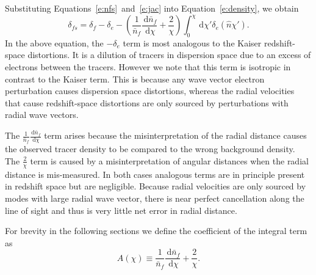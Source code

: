 \documentclass[twocolumn,prl,floatfix]{revtex4-1}
\makeatletter
\newcommand{\ud}{\,\mathrm{d}}
\def\ignorespacesandimplicitepars{%
  \begingroup
  \catcode13=10
  \@ifnextchar\relax
    {\endgroup}%
    {\endgroup}%
}
\renewcommand{\section}[1]{\emph{#1}---\ignorespacesandimplicitepars}
\makeatother
\begin{document}
Substituting Equations~\ref{e:nfs}~and~\ref{e:jac} into Equation~\ref{e:density},
we obtain
\begin{equation}
\label{e:delta_s}
    \delta_{fs} = \delta_f - \delta_e
    - \left(\frac{1}{\bar{n}_f}\frac{\ud \bar{n}_f}{\ud \chi}
    + \frac{2}{\chi} \right)
        \int_0^\chi \ud \chi' \delta_e(\hat n \chi').
\end{equation}
In the above equation, the $-\delta_e$ term is most analogous to the Kaiser
redshift-space distortions.  It is a dilution of tracers in dispersion space due to an
excess of electrons between the tracers. However we note that this term is isotropic
in contrast to the Kaiser term.  This is because any wave vector electron perturbation
causes dispersion space distortions, whereas the radial velocities that cause
redshift-space distortions are only sourced by perturbations with radial wave
vectors.

The $\frac{1}{\bar{n}_f}\frac{\ud \bar{n}_f}{\ud \chi}$ term arises because the
misinterpretation of the radial distance causes the observed tracer density to
be compared to the wrong background density. The $\frac{2}{\chi}$ term is
caused by a misinterpretation of angular distances when the radial distance is
mis-measured.  In both cases analogous terms are in principle present in 
redshift space but are
negligible. Because radial velocities are only sourced by modes with large
radial wave vector, there is near perfect cancellation along the line of sight
and thus is very little net error in radial distance.

For brevity in the following sections we define the coefficient of the integral
term as
\begin{equation}
    \label{e:A}
    A(\chi) \equiv \frac{1}{\bar{n}_f}\frac{\ud \bar{n}_f}{\ud \chi}
    + \frac{2}{\chi}.
\end{equation}


\end{document}
